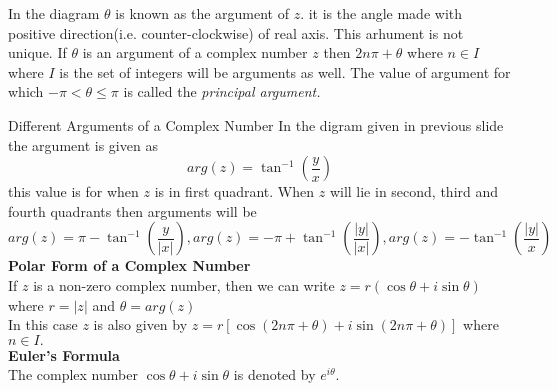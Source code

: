 \documentclass[aspectratio=169,8pt]{beamer}
\newcounter{counter}
\begin{document}
\begin{frame}
  \begin{center}
  \end{center}
  In the diagram $\theta$ is known as the argument of $z.$ it is the angle made
  with positive direction(i.e. counter-clockwise) of real axis. This arhument
  is not unique. If $\theta$ is an argument of a complex number $z$ then $2n\pi
  + \theta$ where $n\in I$ where $I$ is the set of integers will be arguments
  as well. The value of argument for which $-\pi<\theta\leq \pi$ is called the
  \textit{principal argument.}
\end{frame}
\begin{frame}{Different Arguments of a Complex Number}
  In the digram given in previous slide the argument is given as
  $$arg(z) = \tan^{-1}\left(\frac{y}{x}\right)$$
  this value is for when $z$ is in first quadrant. When $z$ will lie in second,
  third and fourth quadrants then arguments will be
  $$arg(z) = \pi - \tan^{-1}\left(\frac{y}{|x|}\right), arg(z) = -\pi +
  \tan^{-1}\left(\frac{|y|}{|x|}\right), arg(z) =
  -\tan^{-1}\left(\frac{|y|}{x}\right)$$
  \vspace*{0.2cm}
  \textbf{\large{Polar Form of a Complex Number}}\\
  \vspace*{0.2cm}
  If $z$ is a non-zero complex number, then we can write $z = r(\cos\theta +
  i\sin\theta)$ where $r = |z|$ and $\theta = arg(z)$\\
  \vspace*{0.2cm}
  In this case $z$ is also given by $z = r[\cos(2n\pi + \theta) + i\sin(2n\pi +
    \theta)]$ where $n\in I.$\\
  \vspace*{0.2cm}
  \textbf{\large{Euler's Formula}}\\
  The complex number $\cos\theta + i\sin\theta$ is denoted by $e^{i\theta}$.
\end{frame}
\end{document}
